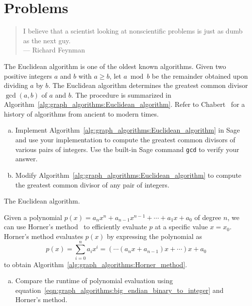 \section{Problems}

\begin{quote}
\footnotesize
I believe that a scientist looking at nonscientific problems is just
as dumb as the next guy. \\
\noindent
--- Richard Feynman
\end{quote}

\begin{problem}
\item The Euclidean algorithm is one of the oldest known
  algorithms. Given two positive integers $a$ and $b$ with $a \geq b$,
  let $a \bmod b$ be the remainder obtained upon dividing $a$ by $b$.
  The Euclidean algorithm determines the greatest common divisor
  $\gcd(a,b)$ of $a$ and $b$. The procedure is summarized in
  Algorithm~\ref{alg:graph_algorithms:Euclidean_algorithm}. Refer to
  Chabert~\cite{Chabert1999} for a history of algorithms from ancient
  to modern times.
  \begin{enumerate}[(a)]
  \item Implement
    Algorithm~\ref{alg:graph_algorithms:Euclidean_algorithm} in Sage
    and use your implementation to compute the greatest common
    divisors of various pairs of integers. Use the built-in Sage
    command \verb!gcd! to verify your answer.

  \item Modify
    Algorithm~\ref{alg:graph_algorithms:Euclidean_algorithm} to
    compute the greatest common divisor of any pair of integers.
  \end{enumerate}

\begin{algorithm}[!htbp]

\caption{The Euclidean algorithm.}
\label{alg:graph_algorithms:Euclidean_algorithm}
\end{algorithm}

\item\label{prob:graph_algorithms:Horner_method} Given a polynomial
  $p(x) = a_n x^n + a_{n-1} x^{n-1} + \cdots + a_1 x + a_0$ of degree
  $n$, we can use Horner's
  method~\cite{Horner1819} to efficiently evaluate $p$ at a specific
  value $x = x_0$. Horner's method evaluates $p(x)$ by expressing the
  polynomial as
  \[
  p(x)
  =
  \sum_{i=0}^n a_i x^i
  =
  (\cdots (a_n x + a_{n-1}) x + \cdots)x + a_0
  \]
  to obtain Algorithm~\ref{alg:graph_algorithms:Horner_method}.
  \begin{enumerate}[(a)]
  \item Compare the runtime of polynomial evaluation using
    equation~\eqref{eqn:graph_algorithms:big_endian_binary_to_integer}
    and Horner's method.


\end{enumerate}
\end{problem}
